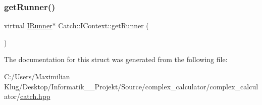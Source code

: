 \mbox{\label{struct_catch_1_1_i_context_af088415dde18d039ed5a2f95b02767c6}} 
\subsubsection{\texorpdfstring{get\+Runner()}{getRunner()}}
{\footnotesize\ttfamily virtual \mbox{\hyperlink{struct_catch_1_1_i_runner}{I\+Runner}}$\ast$ Catch\+::\+I\+Context\+::get\+Runner (\begin{DoxyParamCaption}{ }\end{DoxyParamCaption})\hspace{0.3cm}{\ttfamily [pure virtual]}}



The documentation for this struct was generated from the following file\+:\begin{DoxyCompactItemize}
\item 
C\+:/\+Users/\+Maximilian Klug/\+Desktop/\+Informatik\+\_\+\_\+\+Projekt/\+Source/complex\+\_\+calculator/complex\+\_\+calculator/\mbox{\hyperlink{catch_8hpp}{catch.\+hpp}}\end{DoxyCompactItemize}
